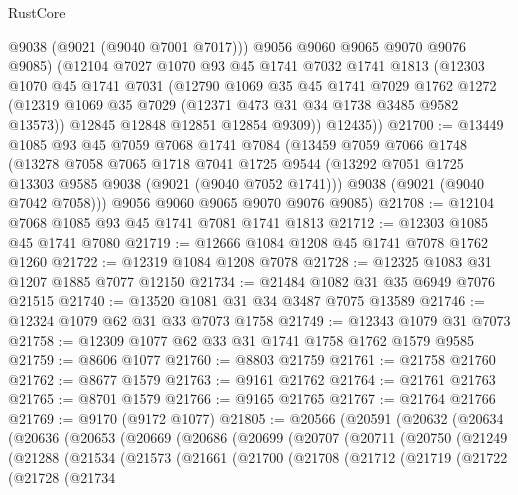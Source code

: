 \begin{lexlean}{RustCore}
\begin{coremodule}
          @9038
          (@9021 (@9040 @7001 @7017)))
        @9056
        @9060
        @9065
        @9070
        @9076
        @9085)
      (@12104
        @7027
        @1070
        @93
        @45
        @1741
        @7032
        @1741
        @1813
        (@12303
          @1070
          @45
          @1741
          @7031
          (@12790
            @1069
            @35
            @45
            @1741
            @7029
            @1762
            @1272
            (@12319 @1069 @35 @7029 (@12371 @473 @31 @34 @1738 @3485 @9582 @13573))
            @12845
            @12848
            @12851
            @12854
            @9309))
        @12435))
@21700 := @13449
    @1085
    @93
    @45
    @7059
    @7068
    @1741
    @7084
    (@13459
      @7059
      @7066
      @1748
      (@13278
        @7058
        @7065
        @1718
        @7041
        @1725
        @9544
        (@13292 @7051 @1725 @13303 @9585 @9038 (@9021 (@9040 @7052 @1741)))
        @9038
        (@9021 (@9040 @7042 @7058)))
      @9056
      @9060
      @9065
      @9070
      @9076
      @9085)
@21708 := @12104 @7068 @1085 @93 @45 @1741 @7081 @1741 @1813
@21712 := @12303 @1085 @45 @1741 @7080
@21719 := @12666 @1084 @1208 @45 @1741 @7078 @1762 @1260
@21722 := @12319 @1084 @1208 @7078
@21728 := @12325 @1083 @31 @1207 @1885 @7077 @12150
@21734 := @21484 @1082 @31 @35 @6949 @7076 @21515
@21740 := @13520 @1081 @31 @34 @3487 @7075 @13589
@21746 := @12324 @1079 @62 @31 @33 @7073 @1758
@21749 := @12343 @1079 @31 @7073
@21758 := @12309 @1077 @62 @33 @31 @1741 @1758 @1762 @1579 @9585
@21759 := @8606 @1077
@21760 := @8803 @21759
@21761 := @21758 @21760
@21762 := @8677 @1579
@21763 := @9161 @21762
@21764 := @21761 @21763
@21765 := @8701 @1579
@21766 := @9165 @21765
@21767 := @21764 @21766
@21769 := @9170 (@9172 @1077)
@21805 := @20566
    (@20591
      (@20632
        (@20634
          (@20636
            (@20653
              (@20669
                (@20686
                  (@20699
                    (@20707
                      (@20711
                        (@20750
                          (@21249
                            (@21288
                              (@21534
                                (@21573
                                  (@21661
                                    (@21700
                                      (@21708
                                        (@21712
                                          (@21719
                                            (@21722
                                              (@21728
                                                (@21734

\end{coremodule}
\end{lexlean}

